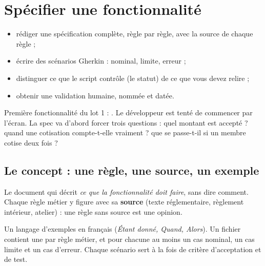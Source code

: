 \chapter{Spécifier une fonctionnalité}\label{ch:spec}

\begin{objectifs}
\begin{itemize}
  \item rédiger une spécification complète, règle par règle, avec la source de chaque règle ;
  \item écrire des scénarios Gherkin : nominal, limite, erreur ;
  \item distinguer ce que le script contrôle (le statut) de ce que vous devez relire ;
  \item obtenir une validation humaine, nommée et datée.
\end{itemize}
\end{objectifs}

\begin{situation}
Première fonctionnalité du lot 1 : . Le développeur est tenté de commencer par
l'écran. La spec va d'abord forcer trois questions : quel montant est accepté ? quand une cotisation
compte-t-elle vraiment ? que se passe-t-il si un membre cotise deux fois ?
\end{situation}

\section{Le concept : une règle, une source, un exemple}
\begin{concept}[Spécification]
Le document qui décrit \emph{ce que la fonctionnalité doit faire}, sans dire comment. Chaque règle métier
y figure avec sa \textbf{source} (texte réglementaire, règlement intérieur, atelier) : une règle sans
source est une opinion.
\end{concept}
\begin{concept}[Gherkin]
Un langage d'exemples en français (\emph{Étant donné, Quand, Alors}). Un fichier 
contient une  par règle métier, et pour chacune au moins un cas nominal, un cas limite et un cas d'erreur.
Chaque scénario sert à la fois de critère d'acceptation et de test.
\end{concept}

